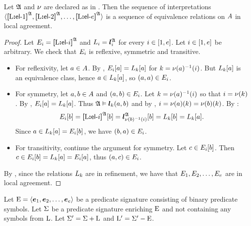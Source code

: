 \begin{remark}\label{rem:local-e-local}
Let $\mathfrak{A}$ and $\nu$ are declared as in .
Then the sequence of interpretations
$\langle {\bm{[}{\mathrm{L}}\mathord{\bm{:}}\mathsf{el}{\hbox{-}}1\bm{]}}^{\mathfrak{A}},{\bm{[}{\mathrm{L}}\mathord{\bm{:}}\mathsf{el}{\hbox{-}}2\bm{]}}^{\mathfrak{A}},\dots,{\bm{[}{\mathrm{L}}\mathord{\bm{:}}\mathsf{el}{\hbox{-}}e\bm{]}}^{\mathfrak{A}} \rangle$ is a
sequence of equivalence relations on $A$ in local agreement.
\end{remark}
\begin{proof}
Let $E_{i} = {\bm{[}{\mathrm{L}}\mathord{\bm{:}}\mathsf{el}{\hbox{-}}i\bm{]}}^{\mathfrak{A}}$ and $L_{i} = \bm{l}_{i}^{\mathfrak{A}}$ for
every $i \in [1,e]$.
Let $i \in [1,e]$ be arbitrary.
We check that $E_{i}$ is reflexive, symmetric and transitive.
\begin{itemize}
  \item For reflexivity, let $a \in A$.
  By ,
  $E_{i}[a] = L_{k}[a]$ for $k = \nu(a)^{-1}(i)$. 
  But $L_{k}[a]$ is an equivalence class, hence $a \in L_{k}[a]$,
  so $(a,a) \in E_{i}$.

  \item For symmetry, let $a, b \in A$ and $(a,b) \in E_{i}$.
  Let $k = \nu(a)^{-1}(i)$ so that $i = \nu(k)$.
  By , $E_{i}[a] = L_{k}[a]$.
  Thus $\mathfrak{A} \vDash \bm{l}_{k}(a,b)$ and by
  , $i = \nu(a)(k) =
  \nu(b)(k)$.
  By :
  \[
    E_{i}[b] =
    {\bm{[}{\mathrm{L}}\mathord{\bm{:}}\mathsf{el}{\hbox{-}}i\bm{]}}^{\mathfrak{A}}[b] =
    \bm{l}_{\nu(b)^{-1}(i)}^{\mathfrak{A}}[b] =
    L_{k}[b] = L_{k}[a].
  \]
  Since $a \in L_{k}[a] = E_{i}[b]$, we have $(b,a) \in
  E_{i}$.
   
  \item For transitivity, continue the argument for symmetry.
  Let $c \in E_{i}[b]$.
  Then $c \in E_{i}[b] = L_{k}[a] = E_{i}[a]$,
  thus $(a,c) \in E_{i}$.
\end{itemize}
By , since the relations $L_{k}$ are in refinement, we
have that $E_{1}, E_{2}, \dots, E_{e}$ are in local agreement.
\end{proof}

Let ${\mathrm{E}} = \left\langle \bm{e}_{1},\bm{e}_{2},\dots,\bm{e}_{e} \right\rangle$ be a predicate signature consisting
of binary predicate symbols.
Let $\mathrm{\Sigma}$ be a predicate signature enriching ${\mathrm{E}}$
and not containing any symbols from ${\mathrm{L}}$. 
Let $\mathrm{\Sigma'} = \mathrm{\Sigma} + {\mathrm{L}}$ and ${{\mathrm{L}}'} = \mathrm{\Sigma'} - {\mathrm{E}}$.

